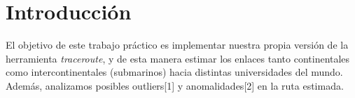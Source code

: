 
\section{Introducción}
El objetivo de este trabajo práctico es implementar nuestra propia versión de la herramienta \textit{traceroute}, y de esta manera estimar los enlaces tanto continentales como intercontinentales (submarinos) hacia distintas universidades del mundo. Además, analizamos posibles outliers[1] y anomalidades[2] en la ruta estimada.